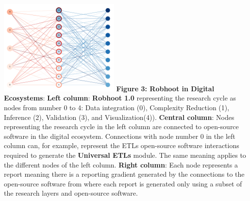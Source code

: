 \documentclass[10pt, a4paper, twocolumn]{article} %
\begin{document}
{  %
  \includegraphics[width=0.45\textwidth]{FigureRobhoot.pdf}
  {\small {\bf Figure 3: Robhoot in Digital Ecosystems}: {\bf Left
      column}: {\bf Robhoot 1.0} representing the research cycle as
    nodes from number 0 to 4: Data integration (0), Complexity
    Reduction (1), Inference (2), Validation (3), and
    Visualization(4)). {\bf Central column}: Nodes representing the
    research cycle in the left column are connected to open-source
    software in the digital ecosystem. Connections with node number 0
    in the left column can, for example, represent the ETLs
    open-source software interactions required to generate the {\bf
      Universal ETLs} module. The same meaning applies to the
    different nodes of the left column. {\bf Right column}: Each node
    represents a report meaning there is a reporting gradient
    generated by the connections to the open-source software from
    where each report is generated only using a subset of the research
    layers and open-source software.}




}
\end{document}
